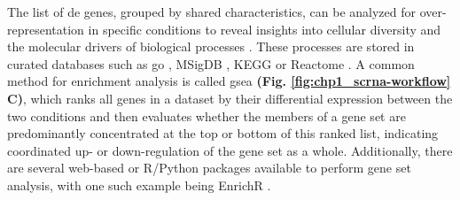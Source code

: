 The list of \gls{de} genes, grouped by shared characteristics, can be analyzed for over-representation in specific conditions to reveal insights into cellular diversity and the molecular drivers of biological processes \textbf{\cite{lueckenmalte_d_current_2019}}. These processes are stored in curated databases such as \gls{go} \textbf{\cite{ashburner_gene_2000}}, MSigDB \textbf{\cite{subramanian_gene_2005,liberzon_molecular_2011,castanza_extending_2023}}, KEGG \textbf{\cite{kanehisa_kegg_2017}} or Reactome \textbf{\cite{gillespie_reactome_2022}}. A common method for enrichment analysis is called \gls{gsea} \textbf{(Fig. \ref{fig:chp1_scrna-workflow} C)}\textbf{\cite{heumos_best_2023,subramanian_gene_2005,korotkevich_fast_2021}}, which ranks all genes in a dataset by their differential expression between the two conditions and then evaluates whether the members of a gene set are predominantly concentrated at the top or bottom of this ranked list, indicating coordinated up- or down-regulation of the gene set as a whole. Additionally, there are several web-based or R/Python packages available to perform gene set analysis, with one such example being EnrichR \textbf{\cite{chen_enrichr_2013,kuleshov_enrichr_2016}}. 




